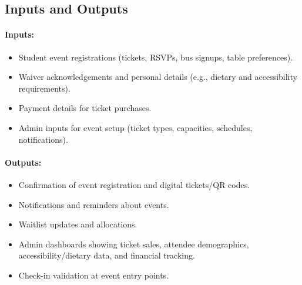 \documentclass{article}
\begin{document}
\subsection{Inputs and Outputs}

\paragraph{Inputs:}
\begin{itemize}
    \item Student event registrations (tickets, RSVPs, bus signups, table preferences).
    \item Waiver acknowledgements and personal details (e.g., dietary and accessibility requirements).
    \item Payment details for ticket purchases.
    \item Admin inputs for event setup (ticket types, capacities, schedules, notifications).
\end{itemize}


\paragraph{Outputs:}
\begin{itemize}
    \item Confirmation of event registration and digital tickets/QR codes.
    \item Notifications and reminders about events.
    \item Waitlist updates and allocations.
    \item Admin dashboards showing ticket sales, attendee demographics, accessibility/dietary data, and financial tracking.
    \item Check-in validation at event entry points.
\end{itemize}
\end{document}
